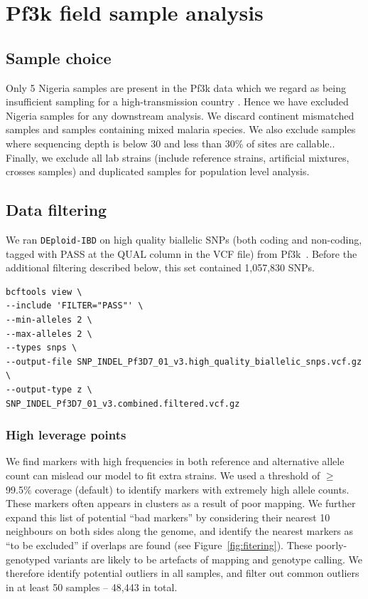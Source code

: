\documentclass[9pt]{article}
\begin{document}
\newpage

\section{Pf3k field sample analysis}
\subsection{Sample choice}
Only 5 Nigeria samples are present in the Pf3k data which we regard as being insufficient sampling for a high-transmission country \citep{who2017profileNigeria}. Hence we have excluded Nigeria samples for any downstream analysis. We discard continent mismatched samples and samples containing mixed malaria species. We also exclude samples where sequencing depth is below 30 and less than 30\% of sites are callable.. Finally, we exclude all lab strains (include reference strains, artificial mixtures, crosses samples) and duplicated samples for population level analysis.


\subsection{Data filtering}
We ran {\tt DEploid-IBD} on high quality biallelic SNPs (both coding and non-coding, tagged with PASS at the QUAL column in the VCF file) from Pf3k~\citep{pf3k}. Before the additional filtering described below, this set contained 1,057,830 SNPs.
\linespread{1}
\begin{lstlisting}
bcftools view \
--include 'FILTER="PASS"' \
--min-alleles 2 \
--max-alleles 2 \
--types snps \
--output-file SNP_INDEL_Pf3D7_01_v3.high_quality_biallelic_snps.vcf.gz \
--output-type z \
SNP_INDEL_Pf3D7_01_v3.combined.filtered.vcf.gz
\end{lstlisting}

\subsubsection{High leverage points}

We find markers with high frequencies in both reference and alternative allele count can mislead our model to fit extra strains. We used a threshold of $\geq$ 99.5\% coverage (default) to identify markers with extremely high allele counts. These markers often appears in clusters as a result of poor mapping. We further expand this list of potential ``bad markers'' by considering their nearest 10 neighbours on both sides along the genome, and identify the nearest markers as ``to be excluded'' if overlaps are found (see Figure~\ref{fig:fitering}). These poorly-genotyped variants are likely to be artefacts of mapping and genotype calling. We therefore identify potential outliers in all samples, and filter out common outliers in at least 50 samples -- 48,443 in total.
\end{document}
